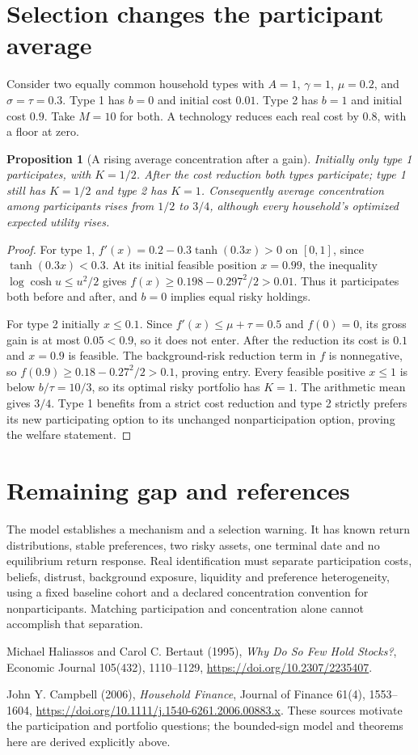 \documentclass[11pt,a4paper]{article}
\newtheorem{proposition}[theorem]{Proposition}
\theoremstyle{definition}
\theoremstyle{remark}
\begin{document}
\section{Selection changes the participant average}
Consider two equally common household types with $A=1$, $\gamma=1$, $\mu=0.2$, and $\sigma=\tau=0.3$. Type 1 has $b=0$ and initial cost $0.01$. Type 2 has $b=1$ and initial cost $0.9$. Take $M=10$ for both. A technology reduces each real cost by $0.8$, with a floor at zero.

\begin{proposition}[A rising average concentration after a gain]
Initially only type 1 participates, with $K=1/2$. After the cost reduction both types participate; type 1 still has $K=1/2$ and type 2 has $K=1$. Consequently average concentration among participants rises from $1/2$ to $3/4$, although every household's optimized expected utility rises.
\end{proposition}
\begin{proof}
For type 1, $f'(x)=0.2-0.3\tanh(0.3x)>0$ on $[0,1]$, since $\tanh(0.3x)<0.3$. At its initial feasible position $x=0.99$, the inequality $\log\cosh u\leq u^2/2$ gives $f(x)\geq0.198-0.297^2/2>0.01$. Thus it participates both before and after, and $b=0$ implies equal risky holdings.

For type 2 initially $x\leq0.1$. Since $f'(x)\leq\mu+\tau=0.5$ and $f(0)=0$, its gross gain is at most $0.05<0.9$, so it does not enter. After the reduction its cost is $0.1$ and $x=0.9$ is feasible. The background-risk reduction term in $f$ is nonnegative, so $f(0.9)\geq0.18-0.27^2/2>0.1$, proving entry. Every feasible positive $x\leq1$ is below $b/\tau=10/3$, so its optimal risky portfolio has $K=1$. The arithmetic mean gives $3/4$. Type 1 benefits from a strict cost reduction and type 2 strictly prefers its new participating option to its unchanged nonparticipation option, proving the welfare statement.
\end{proof}

\section{Remaining gap and references}
The model establishes a mechanism and a selection warning. It has known return distributions, stable preferences, two risky assets, one terminal date and no equilibrium return response. Real identification must separate participation costs, beliefs, distrust, background exposure, liquidity and preference heterogeneity, using a fixed baseline cohort and a declared concentration convention for nonparticipants. Matching participation and concentration alone cannot accomplish that separation.

Michael Haliassos and Carol C. Bertaut (1995), \emph{Why Do So Few Hold Stocks?}, Economic Journal 105(432), 1110--1129, \url{https://doi.org/10.2307/2235407}.

John Y. Campbell (2006), \emph{Household Finance}, Journal of Finance 61(4), 1553--1604, \url{https://doi.org/10.1111/j.1540-6261.2006.00883.x}. These sources motivate the participation and portfolio questions; the bounded-sign model and theorems here are derived explicitly above.
\end{document}
